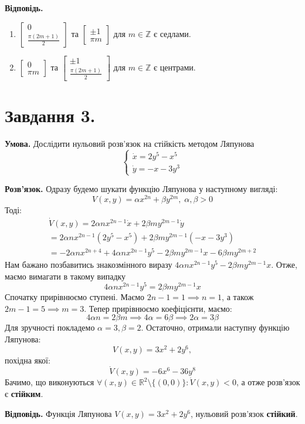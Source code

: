 \documentclass[14pt]{extarticle}
\begin{document}
\textbf{Відповідь.}

\begin{enumerate}
    \item $\begin{bmatrix}
    0 \\ \frac{\pi(2m+1)}{2}
\end{bmatrix}$ та $\begin{bmatrix}
    \pm 1 \\ \pi m
\end{bmatrix}$ для $m \in \mathbb{Z}$ є седлами.
\item $\begin{bmatrix}
    0 \\ \pi m
\end{bmatrix}$ та $\begin{bmatrix}
    \pm 1 \\ \frac{\pi(2m+1)}{2}
\end{bmatrix}$ для $m \in \mathbb{Z}$ є центрами.
\end{enumerate}

\pagebreak
\section*{Завдання 3.}

\textbf{Умова.} Дослідити нульовий розв'язок на стійкість методом Ляпунова
\[
\begin{cases}
    \dot{x} = 2y^5 - x^5 \\
    \dot{y} = -x-3y^3
\end{cases}
\]

\textbf{Розв'язок.} Одразу будемо шукати функцію Ляпунова у наступному вигляді:
\[
V(x,y) = \alpha x^{2n} + \beta y^{2m}, \; \alpha,\beta>0
\]
Тоді:
\begin{gather*}
\dot{V}(x,y) = 2\alpha n x^{2n-1}\dot{x} + 2\beta m y^{2m-1} \dot{y} \\
= 2\alpha n x^{2n-1}(2y^5 - x^5) + 2\beta m y^{2m-1}(-x-3y^3) \\
= -2\alpha n x^{2n+4} + 4\alpha n x^{2n-1}y^5 - 2\beta m y^{2m-1}x - 6\beta m y^{2m+2}
\end{gather*}
Нам бажано позбавитись знакозмінного виразу $4\alpha n x^{2n-1}y^5 - 2\beta m y^{2m-1}x$. Отже, маємо вимагати в такому випадку
\[
4\alpha n x^{2n-1}y^5 = 2\beta m y^{2m-1}x
\]
Спочатку прирівнюємо ступені. Маємо $2n-1=1 \implies n=1$, а також $2m-1=5 \implies m=3$. Тепер прирівнюємо коефіцієнти, маємо:
\[
4\alpha n = 2\beta m \implies 4\alpha = 6\beta \implies 2\alpha = 3\beta
\]
Для зручності покладемо $\alpha=3,\beta=2$. Остаточно, отримали наступну функцію Ляпунова:
\[
V(x,y) = 3x^2 + 2y^6,
\]
похідна якої:
\[
\dot{V}(x,y) = -6x^6 - 36y^8
\]
Бачимо, що виконуються $\forall (x,y) \in \mathbb{R}^2 \setminus \{(0,0)\}: \dot{V}(x,y) < 0$, а отже розв'язок є \textbf{стійким}.

\textbf{Відповідь.} Функція Ляпунова $V(x,y)=3x^2+2y^6$, нульовий розв'язок \textbf{стійкий}.
\end{document}
